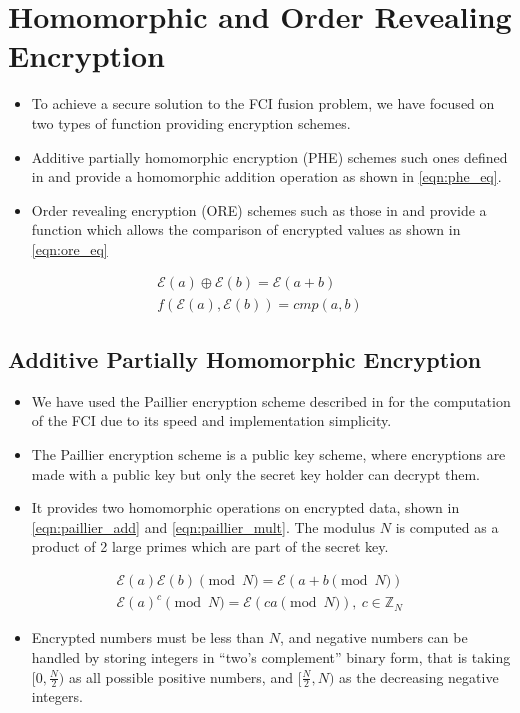 \documentclass[letterpaper, 10 pt, conference]{ieeeconf}  %
\begin{document}
\section{Homomorphic and Order Revealing Encryption} \label{sec:encryption}
\begin{itemize}
   \item To achieve a secure solution to the FCI fusion problem, we have focused on two types of function providing encryption schemes. 
   \item Additive partially homomorphic encryption (PHE) schemes such ones defined in \cite{paillierPublicKeyCryptosystemsBased1999} and \cite{goldwasserProbabilisticEncryption1984a} provide a homomorphic addition operation as shown in \eqref{eqn:phe_eq}.
   \item Order revealing encryption (ORE) schemes such as those in \cite{chenettePracticalOrderRevealingEncryption2016} and \cite{lewiOrderRevealingEncryptionNew2016} provide a function which allows the comparison of encrypted values as shown in \eqref{eqn:ore_eq}
\end{itemize}
\begin{gather}
   \mathcal{E}(a) \oplus \mathcal{E}(b) = \mathcal{E}(a+b) \label{eqn:phe_eq}\\
   f(\mathcal{E}(a), \mathcal{E}(b)) = cmp(a, b) \label{eqn:ore_eq}
\end{gather}

\subsection{Additive Partially Homomorphic Encryption}
\begin{itemize}
   \item We have used the Paillier encryption scheme described in \cite{paillierPublicKeyCryptosystemsBased1999} for the computation of the FCI due to its speed and implementation simplicity.
   \item The Paillier encryption scheme is a public key scheme, where encryptions are made with a public key but only the secret key holder can decrypt them.
   \item It provides two homomorphic operations on encrypted data, shown in \eqref{eqn:paillier_add} and \eqref{eqn:paillier_mult}. The modulus $N$ is computed as a product of 2 large primes which are part of the secret key.
\end{itemize}
\begin{gather}
   \mathcal{E}(a)\mathcal{E}(b) \pmod{N} = \mathcal{E}(a + b \pmod{N}) \label{eqn:paillier_add}\\
   \mathcal{E}(a)^c \pmod{N} = \mathcal{E}(ca \pmod{N}),\ c \in \mathbb{Z}_N \label{eqn:paillier_mult}
\end{gather}
\begin{itemize}
   \item Encrypted numbers must be less than $N$, and negative numbers can be handled by storing integers in ``two's complement'' binary form, that is taking $[0, \frac{N}{2})$ as all possible positive numbers, and $[\frac{N}{2}, N)$ as the decreasing negative integers.
\end{itemize}
\end{document}
